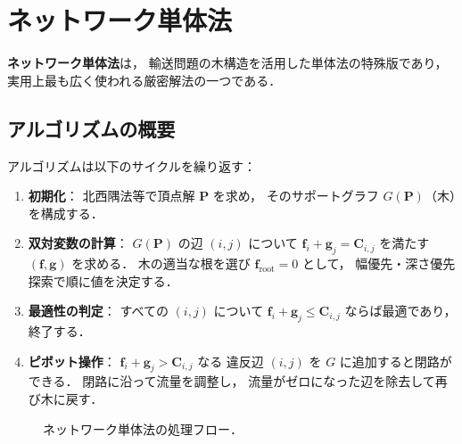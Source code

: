 \section{ネットワーク単体法}\label{sec:network-simplex}

\textbf{ネットワーク単体法}は，
輸送問題の木構造を活用した単体法の特殊版であり，
実用上最も広く使われる厳密解法の一つである．

\subsection{アルゴリズムの概要}\label{subsec:ns-overview}

アルゴリズムは以下のサイクルを繰り返す：

\begin{enumerate}
  \item \textbf{初期化}：
    北西隅法等で頂点解 $\mathbf{P}$ を求め，
    そのサポートグラフ $G(\mathbf{P})$（木）を構成する．
  \item \textbf{双対変数の計算}：
    $G(\mathbf{P})$ の辺 $(i,j)$ について
    $\mathbf{f}_i + \mathbf{g}_j = \mathbf{C}_{i,j}$
    を満たす $(\mathbf{f}, \mathbf{g})$ を求める．
    木の適当な根を選び $\mathbf{f}_{\mathrm{root}} = 0$ として，
    幅優先・深さ優先探索で順に値を決定する．
  \item \textbf{最適性の判定}：
    すべての $(i,j)$ について
    $\mathbf{f}_i + \mathbf{g}_j \leq \mathbf{C}_{i,j}$
    ならば最適であり，終了する．
  \item \textbf{ピボット操作}：
    $\mathbf{f}_i + \mathbf{g}_j > \mathbf{C}_{i,j}$ なる
    違反辺 $(i,j)$ を $G$ に追加すると閉路ができる．
    閉路に沿って流量を調整し，
    流量がゼロになった辺を除去して再び木に戻す．
\end{enumerate}

\begin{figure}[htbp]
\centering
{}
\caption{ネットワーク単体法の処理フロー．}
\label{fig:network-simplex-flow}
\end{figure}

